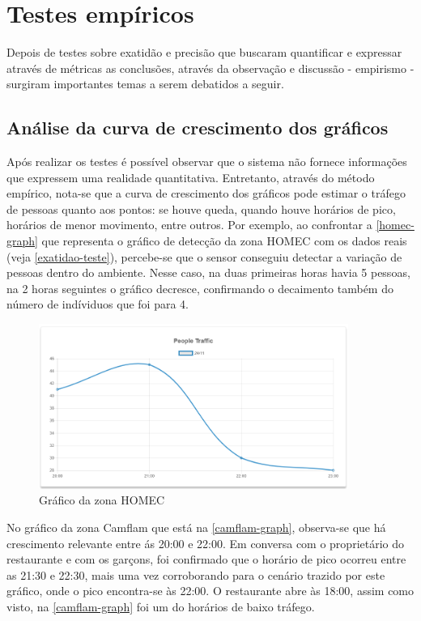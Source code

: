 \section{Testes empíricos}
Depois de testes sobre exatidão e precisão que buscaram quantificar e expressar através de métricas
as conclusões, através da observação e discussão - empirismo - surgiram importantes temas a serem debatidos
a seguir.

\subsection{Análise da curva de crescimento dos gráficos}
Após realizar os testes é possível observar que o sistema não fornece informações
que expressem uma realidade quantitativa. Entretanto, através do método
empírico, nota-se que a curva de crescimento dos gráficos pode estimar o tráfego
de pessoas quanto aos pontos: se houve queda, quando houve horários de pico,
horários de menor movimento, entre outros. Por exemplo, ao confrontar a \autoref{homec-graph} que representa
o gráfico de detecção da zona HOMEC com os dados reais (veja \autoref{exatidao-teste}), percebe-se que
o sensor conseguiu detectar a variação de pessoas dentro do ambiente. Nesse caso, na duas primeiras horas havia 5 pessoas, na 2 horas
seguintes o gráfico decresce, confirmando o decaimento também do número de indíviduos que foi para 4.

\begin{figure}[!h]
  \caption{\label{homec-graph}Gráfico da zona HOMEC}
  \begin{center}
    \includegraphics[width=0.90\textwidth]{img/graph-homec.png}
  \end{center}
\end{figure}

No gráfico da zona Camflam que está na \autoref{camflam-graph}, observa-se que
há crescimento relevante entre ás 20:00 e 22:00. Em conversa com o proprietário
do restaurante e com os garçons, foi confirmado que o horário de pico ocorreu
entre as 21:30 e 22:30, mais uma vez corroborando para o cenário trazido por este
gráfico, onde o pico encontra-se às 22:00. O restaurante abre às 18:00, assim como visto,
na \autoref{camflam-graph} foi um do horários de baixo tráfego.


